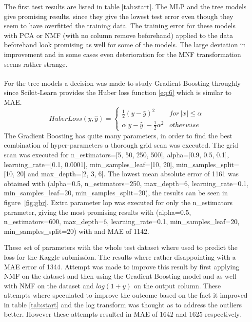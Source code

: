 \documentclass[a4paper]{article}
\begin{document}
The first test results are listed in table \ref{tab:start}. The MLP and the tree models give promising results, since they give the lowest test error even though they seem to have overfitted the training data. The training error for these models with PCA or NMF (with no column remove beforehand) applied to the data beforehand look promising as well for some of the models. The large deviation in improvement and in some cases even deterioration for the MNF transformation seems rather strange. \\\\
For the tree models a decision was made to study Gradient Boosting throughly since Scikit-Learn provides the Huber loss function \ref{eq:6} which is similar to MAE.
\begin{equation} \label{eq:6}
HuberLoss(y, \hat{y}) = \begin{cases} 
                  \frac{1}{2}(y - \hat{y})^2 & for\ |x|\leq \alpha \\
                  \alpha|y - \hat{y}|-\frac{1}{2}\alpha^2 & otherwise
               \end{cases}
\end{equation}
The Gradient Boosting has quite many parameters, in order to find the best combination of hyper-parameters a thorough grid scan was executed. The grid scan was executed for n\_estimators=[5, 50, 250, 500], alpha=[0.9, 0.5, 0.1], learning\_rate=[0.1, 0.0001], min\_samples\_leaf=[10, 20], min\_samples\_split=[10, 20] and max\_depth=[2, 3, 6]. The lowest mean absolute error of 1161 was obtained with (alpha=0.5, n\_estimators=250, max\_depth=6, learning\_rate=0.1, min\_samples\_leaf=20, min\_samples\_split=20), the results can be seen in figure~\ref{fig:gbr}. Extra parameter lop was executed for only the n\_estimators parameter, giving the most promising results with (alpha=0.5, n\_estimators=600, max\_depth=6, learning\_rate=0.1, min\_samples\_leaf=20, min\_samples\_split=20) with and MAE of 1142.

These set of parameters with the whole test dataset where used to predict the loss for the Kaggle submission. The results where rather disappointing with a MAE error of 1344. Attempt was made to improve this result by first applying NMF on the dataset and then using the Gradient Boosting model and as well with NMF on the dataset and $log(1 + y)$ on the output column. These attempts where speculated to improve the outcome based on the fact it improved in table \ref{tab:start} and the log transform was thought as to address the outliers better. However these attempts resulted in MAE of 1642 and 1625 respectively.  
\end{document}
